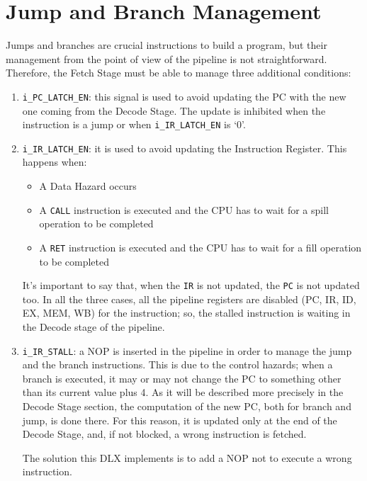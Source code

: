 \section{Jump and Branch Management}
\label{sec:jmp_branch}
Jumps and branches are crucial instructions to build a program, but their management from the point of view of the pipeline is not straightforward. Therefore, the Fetch Stage must be able to manage three additional conditions:
\begin{enumerate}
    \item \texttt{i\_PC\_LATCH\_EN}: this signal is used to avoid updating the PC with the new one coming from the Decode Stage. The update is inhibited when the instruction is a jump or when \texttt{i\_IR\_LATCH\_EN} is `0'. 
    \item \texttt{i\_IR\_LATCH\_EN}: it is used to avoid updating the Instruction Register. This happens when:
    \begin{itemize}
        \item A Data Hazard occurs
        \item A \texttt{CALL} instruction is executed and the CPU has to wait for a spill operation to be completed
        \item A \texttt{RET} instruction is executed and the CPU has to wait for a fill operation to be completed
    \end{itemize}
    It's important to say that, when the \texttt{IR} is not updated, the \texttt{PC} is not updated too. In all the three cases, all the pipeline registers are disabled (PC, IR, ID, EX, MEM, WB) for the instruction; so, the stalled instruction is waiting in the Decode stage of the pipeline.
    \item \texttt{i\_IR\_STALL}: a NOP is inserted in the pipeline in order to manage the jump and the branch instructions. This is due to the control hazards; when a branch is executed, it may or may not change the PC to something other than its current value plus 4. As it will be described more precisely in the Decode Stage section, the computation of the new PC, both for branch and jump, is done there. For this reason, it is updated only at the end of the Decode Stage, and, if not blocked, a wrong instruction is fetched.
    
    The solution this DLX implements is to add a NOP not to execute a wrong instruction.
\end{enumerate}